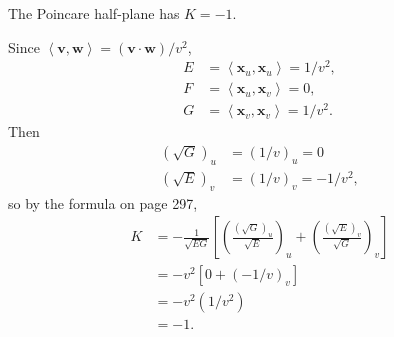 \documentclass[10pt]{report}
\begin{document}

\begin{exer}[7.2: 1]
The Poincare half-plane has $K=-1$.
\end{exer}
Since $\left\langle \mathbf{v},\mathbf{w} \right\rangle = (\mathbf{v}\cdot \mathbf{w})/v^2$,
\begin{align*}
	E &= \left\langle \mathbf{x}_{u},\mathbf{x}_{u} \right\rangle = 1/v^2, \\
	F &= \left\langle \mathbf{x}_{u},\mathbf{x}_{v} \right\rangle = 0, \\
	G &= \left\langle \mathbf{x}_{v},\mathbf{x}_{v} \right\rangle = 1/v^2.
\end{align*}
Then
\begin{align*}
	(\sqrt{G} )_{u}&=(1/v)_{u}=0\\
	(\sqrt{E} )_{v}&=(1/v)_{v}=-1/v^2,
\end{align*}
so by the formula on page 297,
\begin{align*}
	K &= -\frac{1}{\sqrt{EG} } \left[ \left( \frac{(\sqrt{G} )_{u}}{\sqrt{E} }  \right)_{u}+ \left( \frac{(\sqrt{E} )_{v}}{\sqrt{G} }  \right)_{v} \right] \\
	  &= -v^2 \left[ 0 + (-1/v)_{v} \right] \\
	  &= -v^2 (1/v^2) \\
	  &= -1.
\end{align*}
\end{document}

